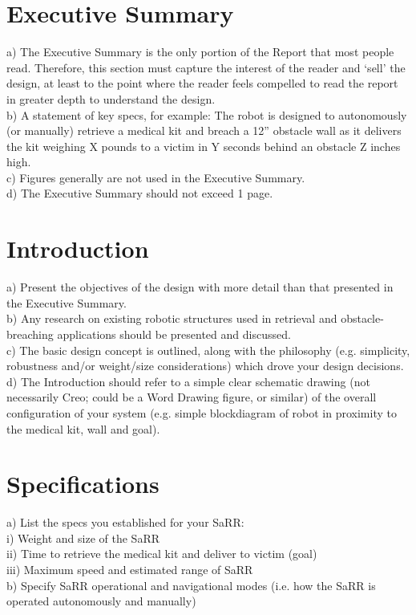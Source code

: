 \documentclass[12pt]{article}
\begin{document}



\section{Executive Summary}
a) The Executive Summary is the only portion of the Report that most people read. Therefore, this section must capture the interest of the reader and ‘sell’ the design, at least to the point where the reader feels compelled to read the report in greater depth to understand the design.\\
b) A statement of key specs, for example: The robot is designed to autonomously (or manually) retrieve a medical kit and breach a 12” obstacle wall as it delivers the kit weighing X pounds to a victim in Y seconds behind an obstacle Z inches high.\\
c) Figures generally are not used in the Executive Summary.\\
d) The Executive Summary should not exceed 1 page. 
\newpage


\tableofcontents
\newpage


\section{Introduction}

a) Present the objectives of the design with more detail than that presented in the Executive Summary.\\
b) Any research on existing robotic structures used in retrieval and obstacle-breaching applications should be presented and discussed.\\
c) The basic design concept is outlined, along with the philosophy (e.g. simplicity, robustness and/or weight/size considerations) which drove your design decisions. \\
d) The Introduction should refer to a simple clear schematic drawing (not necessarily Creo; could be a Word Drawing figure, or similar) of the overall configuration of your system (e.g. simple blockdiagram of robot in proximity to the medical kit, wall and goal).


\section{Specifications}
a) List the specs you established for your SaRR:\\
i) Weight and size of the SaRR\\
ii) Time to retrieve the medical kit and deliver to victim (goal)\\
iii) Maximum speed and estimated range of SaRR\\
b) Specify SaRR operational and navigational modes (i.e. how the SaRR is operated autonomously and manually) 
\end{document}
